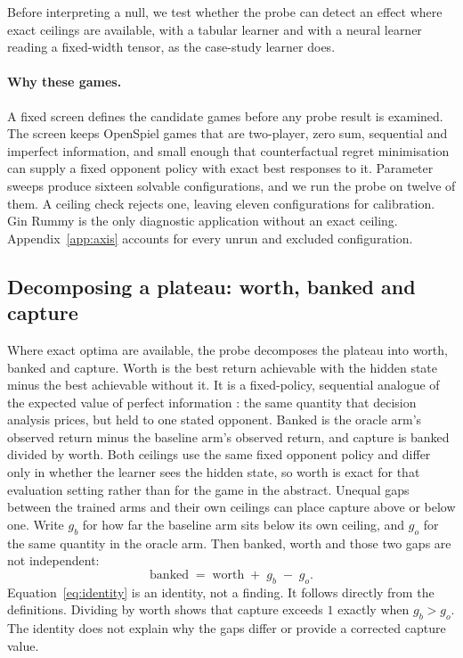 \documentclass{article}
\begin{document}
Before interpreting a null, we test whether the probe can detect an effect where exact ceilings are available, with a tabular learner and with a neural learner reading a fixed-width tensor, as the case-study learner does.

\paragraph{Why these games.} A fixed screen defines the candidate games before any probe result is examined. The screen keeps OpenSpiel games that are two-player, zero sum, sequential and imperfect information, and small enough that counterfactual regret minimisation can supply a fixed opponent policy with exact best responses to it. Parameter sweeps produce sixteen solvable configurations, and we run the probe on twelve of them. A ceiling check rejects one, leaving eleven configurations for calibration. Gin Rummy is the only diagnostic application without an exact ceiling. Appendix~\ref{app:axis} accounts for every unrun and excluded configuration.

\subsection{Decomposing a plateau: worth, banked and capture}
\label{sec:decomp}

Where exact optima are available, the probe decomposes the plateau into worth, banked and capture. Worth is the best return achievable with the hidden state minus the best achievable without it. It is a fixed-policy, sequential analogue of the expected value of perfect information \citep{voi}: the same quantity that decision analysis prices, but held to one stated opponent. Banked is the oracle arm's observed return minus the baseline arm's observed return, and capture is banked divided by worth. Both ceilings use the same fixed opponent policy and differ only in whether the learner sees the hidden state, so worth is exact for that evaluation setting rather than for the game in the abstract. Unequal gaps between the trained arms and their own ceilings can place capture above or below one. Write $g_b$ for how far the baseline arm sits below its own ceiling, and $g_o$ for the same quantity in the oracle arm. Then banked, worth and those two gaps are not independent:
%
\begin{equation}
\text{banked} \;=\; \text{worth} \;+\; g_b \;-\; g_o .
\label{eq:identity}
\end{equation}
%
Equation~\eqref{eq:identity} is an identity, not a finding. It follows directly from the definitions. Dividing by worth shows that capture exceeds $1$ exactly when $g_b > g_o$. The identity does not explain why the gaps differ or provide a corrected capture value.
\end{document}
